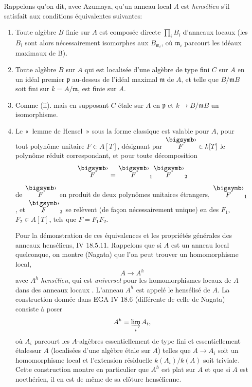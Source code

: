 \documentclass[10pt]{../fichiers-configuration-latex/smfart}
\begin{document}
Rappelons qu'on dit, avec Azumaya, qu'un anneau local $A$ est
\emph{hensélien} s'il satisfait aux conditions équivalentes suivantes:
\begin{enumerate}
\renewcommand{\theenumi}{\roman{enumi}}
\renewcommand{\labelenumi}{(\theenumi)}
\item Toute algèbre $B$ finie sur $A$ est composée directe
$\prod_{i} B_i$ d'anneaux locaux (les $B_i$ sont alors
nécessairement isomorphes aux $B_{\mathfrak{m}_i}$, où\pageoriginale
$\mathfrak{m}_i$ parcourt les idéaux maximaux de B).

\item  Toute algèbre $B$ sur $A$ qui est localisée d'une algèbre de
  type fini $C$ sur $A$ en un idéal premier $\mathfrak{p}$ au-dessus de
  l'idéal maximal $\mathfrak{m}$ de $A$, et telle que $B /\mathfrak{m}
  B$ soit fini sur $k = A / \mathfrak{m}$, est finie sur $A$.

\item Comme (ii). mais en supposant $C$ étale sur $A$ en $\mathfrak{p}$
  et $k \to B /\mathfrak{m} B$ un isomorphisme.

\item Le « lemme de Hensel » sous la forme classique est valable
  pour $A$, \ie pour tout polynôme unitaire $F \in A [T]$, désignant
  par $\overset{\bigdot}{F} \in k [T]$ le polynôme réduit correspondant,
  et pour toute décomposition
$$
\overset{\bigdot}{F} = \overset{\bigdot}{F}_1 \overset{\bigdot}{F}_2
$$
de $\overset{\bigdot}{F}$ en produit de deux polynômes unitaires
étrangers, $\overset{\bigdot}{F}_1$, et $\overset{\bigdot}{F}_2$ se
relèvent (de façon nécessairement unique) en des $F_1$, $F_2 \in A
[T]$, tels que $F = F_1 F_2$.

Pour la démonstration de ces équivalences et les propriétés générales
des anneaux henséliens, \cf \EGA IV 18.5.11. Rappelons que si $A$ est
un anneau local quelconque, on montre (Nagata) que l'on peut trouver
un homomorphisme local,
$$
A \to A^{h}
$$
avec $A^{h}$ \emph{hensélien}, qui est \emph{universel} pour les
homomorphismes locaux de $A$ dans des anneaux locaux
. L'anneau $A^h$ est appelé le hensélisé de $A$. La
construction donnée dans EGA IV 18.6 (différente de celle de Nagata)
consiste à poser
$$
A^h = \varinjlim_i A_i{},
$$
où $A_i$ parcourt les $A$-algèbres essentiellement de type fini et
essentiellement étales\pageoriginale sur $A$ (\ie localisées d'une
algèbre étale sur $A$) telles que $A \to A_i$ soit un homomorphisme
local et l'extension résiduelle $k(A_i) / k(A)$ soit triviale. Cette
construction montre en particulier que $A^h$ est plat sur $A$ et que
si $A$ est noethérien, il en est de même de sa clôture
hensélienne.
\end{enumerate}
\end{document}
